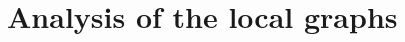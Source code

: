 \documentclass[12 pt]{report}
\begin{document}


\chapter{Analysis of the local graphs}
\label{chap:locgraph}
\onehalfspacing


%
%
\end{document}
